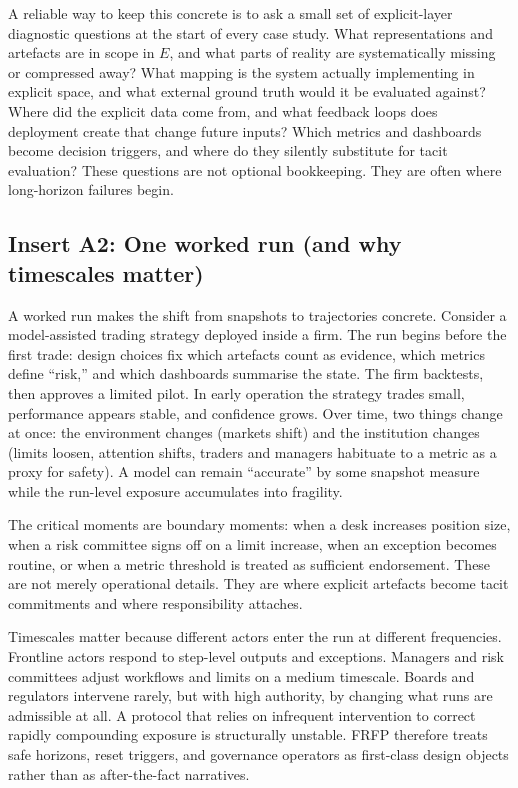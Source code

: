 A reliable way to keep this concrete is to ask a small set of explicit-layer diagnostic questions at the start of every case study. What representations and artefacts are in scope in \(E\), and what parts of reality are systematically missing or compressed away? What mapping is the system actually implementing in explicit space, and what external ground truth would it be evaluated against? Where did the explicit data come from, and what feedback loops does deployment create that change future inputs? Which metrics and dashboards become decision triggers, and where do they silently substitute for tacit evaluation? These questions are not optional bookkeeping. They are often where long-horizon failures begin.

\subsection{Insert A2: One worked run (and why timescales matter)}
\label{sec:intro-worked-run}

A worked run makes the shift from snapshots to trajectories concrete. Consider a model-assisted trading strategy deployed inside a firm. The run begins before the first trade: design choices fix which artefacts count as evidence, which metrics define ``risk,'' and which dashboards summarise the state. The firm backtests, then approves a limited pilot. In early operation the strategy trades small, performance appears stable, and confidence grows. Over time, two things change at once: the environment changes (markets shift) and the institution changes (limits loosen, attention shifts, traders and managers habituate to a metric as a proxy for safety). A model can remain ``accurate'' by some snapshot measure while the run-level exposure accumulates into fragility.

The critical moments are boundary moments: when a desk increases position size, when a risk committee signs off on a limit increase, when an exception becomes routine, or when a metric threshold is treated as sufficient endorsement. These are not merely operational details. They are where explicit artefacts become tacit commitments and where responsibility attaches.

Timescales matter because different actors enter the run at different frequencies. Frontline actors respond to step-level outputs and exceptions. Managers and risk committees adjust workflows and limits on a medium timescale. Boards and regulators intervene rarely, but with high authority, by changing what runs are admissible at all. A protocol that relies on infrequent intervention to correct rapidly compounding exposure is structurally unstable. FRFP therefore treats safe horizons, reset triggers, and governance operators as first-class design objects rather than as after-the-fact narratives.

